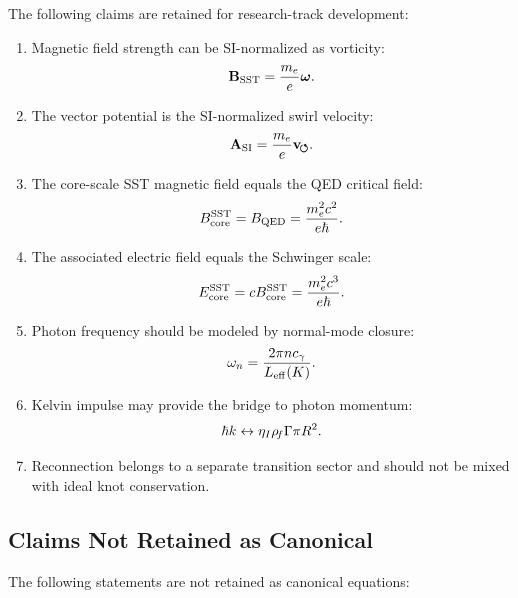     The following claims are retained for research-track development:
    
    \begin{enumerate}
        \item Magnetic field strength can be SI-normalized as vorticity:
        \[
            \mathbf{B}_{\rm SST}
            =
            \frac{m_e}{e}\boldsymbol{\omega}.
        \]
        
        \item The vector potential is the SI-normalized swirl velocity:
        \[
            \mathbf{A}_{\rm SI}
            =
            \frac{m_e}{e}\mathbf{v}_{\!\boldsymbol{\circlearrowleft}}.
        \]
        
        \item The core-scale SST magnetic field equals the QED critical field:
        \[
            B_{\rm core}^{\rm SST}
            =
            B_{\rm QED}
            =
            \frac{m_e^2c^2}{e\hbar}.
        \]
        
        \item The associated electric field equals the Schwinger scale:
        \[
            E_{\rm core}^{\rm SST}
            =
            cB_{\rm core}^{\rm SST}
            =
            \frac{m_e^2c^3}{e\hbar}.
        \]
        
        \item Photon frequency should be modeled by normal-mode closure:
        \[
            \omega_n
            =
            \frac{2\pi n c_\gamma}{L_{\rm eff}(K)}.
        \]
        
        \item Kelvin impulse may provide the bridge to photon momentum:
        \[
            \hbar k
            \leftrightarrow
            \eta_I\rho_{\!f}\Gamma\pi R^2.
        \]
        
        \item Reconnection belongs to a separate transition sector and should
        not be mixed with ideal knot conservation.
    \end{enumerate}

\subsection{Claims Not Retained as Canonical}
    
    The following statements are not retained as canonical equations:
    
